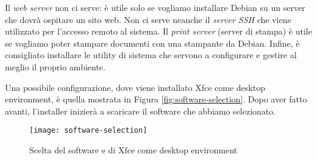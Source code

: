 Il \textit{web server} non ci serve: è utile solo se vogliamo installare Debian su un server che dovrà ospitare un sito web. Non ci serve neanche il \textit{server SSH} che viene utilizzato per l'accesso remoto al sistema. Il \textit{print server} (server di stampa) è utile se vogliamo poter stampare documenti con una stampante da Debian. Infine, è consigliato installare le utility di sistema che servono a configurare e gestire al meglio il proprio ambiente.

Una possibile configurazione, dove viene installato Xfce come desktop environment, è quella mostrata in Figura \vref{fig:software-selection}. Dopo aver fatto avanti, l'installer inizierà a scaricare il software che abbiamo selezionato.

\begin{figure}[ht]
	\centering
	\texttt{[image: software-selection]}
	\caption{Scelta del software e di Xfce come desktop environment}
	\label{fig:software-selection}
\end{figure}
